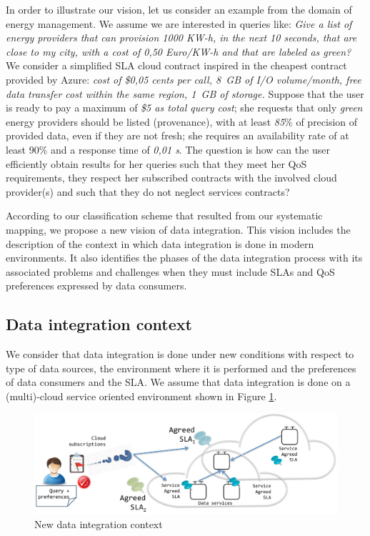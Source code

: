 
In order to illustrate our vision, let us consider an example from the domain of energy
management. We assume we are interested in queries like: \textit{Give a list
of energy providers that can provision 1000 KW-h, in the next 10 seconds, that are close to my city, with a cost of 0,50 Euro/KW-h and that are labeled as green?} We consider a simplified SLA cloud contract inspired in the cheapest contract provided by Azure: \textit{cost of \$0,05 cents per call,  8~GB of I/O volume/month, free data transfer cost within the same region,  1~GB of storage.} 
Suppose that the user is ready to pay a maximum of \textit{\$5 as total query cost}; she requests that only  \textit{green} energy providers should be  listed (provenance), with at least  \textit{85$\%$} of precision of provided data, even if they are not fresh; she requires an availability rate of at least 90$\%$ and a response time of  \textit{0,01 s}. 
  The question is how can the user efficiently obtain  results for her queries such that they meet her QoS requirements, they respect her subscribed contracts with the involved cloud provider(s) and such that they do not neglect services contracts? 

According to our classification scheme that resulted from our systematic mapping, we propose a new vision of data integration. This vision includes the description of the context in which data integration is done in modern environments. It also identifies the phases of the data integration process with its associated problems and challenges when they must include SLAs and QoS preferences expressed by data consumers. 


\subsection{Data integration context}
We consider that data integration is done under new conditions with respect to type of data sources, the environment where it is performed and the preferences  of data consumers and the SLA. We assume that data integration is done on a (multi)-cloud service oriented environment shown in Figure \ref{fig:vision}. 
\begin{figure}[h!]
\centering
\includegraphics[scale=0.50]{figs/DataIntegrationContext.pdf} 
\caption{New data integration context}\label{fig:vision}
\end{figure}

